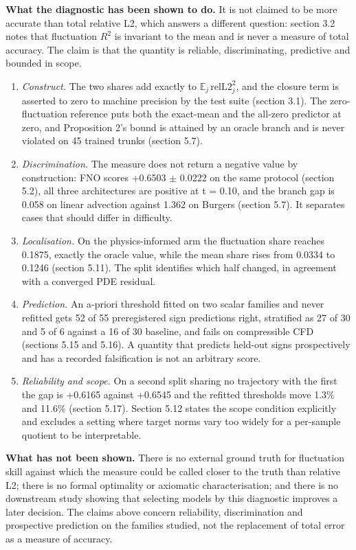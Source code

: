 \documentclass[preprint,12pt]{elsarticle}
\begin{document}
\textbf{What the diagnostic has been shown to do.} It is not claimed to be more accurate than total relative L2, which answers a different question: section 3.2 notes that fluctuation $R^2$ is invariant to the mean and is never a measure of total accuracy. The claim is that the quantity is reliable, discriminating, predictive and bounded in scope.

\begin{enumerate}
\item \emph{Construct.} The two shares add exactly to $\mathbb{E}_j\,\mathrm{relL2}_j^2$, and the closure term is asserted to zero to machine precision by the test suite (section 3.1). The zero-fluctuation reference puts both the exact-mean and the all-zero predictor at zero, and Proposition 2's bound is attained by an oracle branch and is never violated on 45 trained trunks (section 5.7).
\item \emph{Discrimination.} The measure does not return a negative value by construction: FNO scores +0.6503 $\pm$ 0.0222 on the same protocol (section 5.2), all three architectures are positive at t = 0.10, and the branch gap is 0.058 on linear advection against 1.362 on Burgers (section 5.7). It separates cases that should differ in difficulty.
\item \emph{Localisation.} On the physics-informed arm the fluctuation share reaches 0.1875, exactly the oracle value, while the mean share rises from 0.0334 to 0.1246 (section 5.11). The split identifies which half changed, in agreement with a converged PDE residual.
\item \emph{Prediction.} An a-priori threshold fitted on two scalar families and never refitted gets 52 of 55 preregistered sign predictions right, stratified as 27 of 30 and 5 of 6 against a 16 of 30 baseline, and fails on compressible CFD (sections 5.15 and 5.16). A quantity that predicts held-out signs prospectively and has a recorded falsification is not an arbitrary score.
\item \emph{Reliability and scope.} On a second split sharing no trajectory with the first the gap is +0.6165 against +0.6545 and the refitted thresholds move 1.3\% and 11.6\% (section 5.17). Section 5.12 states the scope condition explicitly and excludes a setting where target norms vary too widely for a per-sample quotient to be interpretable.
\end{enumerate}


\textbf{What has not been shown.} There is no external ground truth for fluctuation skill against which the measure could be called closer to the truth than relative L2; there is no formal optimality or axiomatic characterisation; and there is no downstream study showing that selecting models by this diagnostic improves a later decision. The claims above concern reliability, discrimination and prospective prediction on the families studied, not the replacement of total error as a measure of accuracy.
\end{document}
